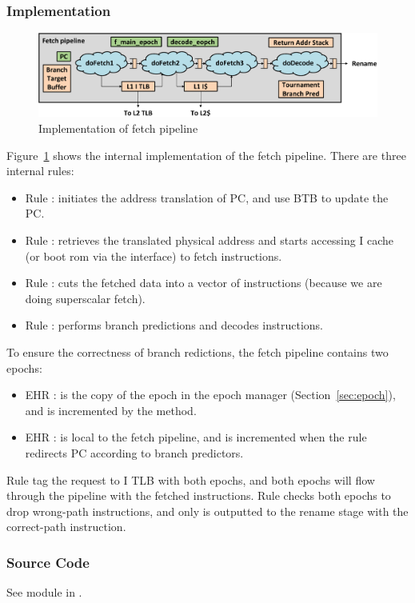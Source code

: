 \subsubsection{Implementation}

\begin{figure}
    \centering
    \includegraphics[width=\columnwidth]{fig/fetch_crop.pdf}
    \caption{Implementation of fetch pipeline}\label{fig:fetch-impl}
\end{figure}

Figure~\ref{fig:fetch-impl} shows the internal implementation of the fetch pipeline.
There are three internal rules:
\begin{itemize}
    \item Rule : initiates the address translation of PC, and use BTB to update the PC.
    \item Rule : retrieves the translated physical address and starts accessing I cache (or boot rom via the  interface) to fetch instructions.
    \item Rule : cuts the fetched data into a vector of instructions (because we are doing superscalar fetch).
    \item Rule : performs branch predictions and decodes instructions.
\end{itemize}
To ensure the correctness of branch redictions, the fetch pipeline contains two epochs:
\begin{itemize}
    \item EHR : is the copy of the epoch in the epoch manager (Section~\ref{sec:epoch}), and is incremented by the  method.
    \item EHR : is local to the fetch pipeline, and is incremented when the  rule redirects PC according to branch predictors.
\end{itemize}
Rule  tag the request to I TLB with both epochs, and both epochs will flow through the pipeline with the fetched instructions.
Rule  checks both epochs to drop wrong-path instructions, and only  is outputted to the rename stage with the correct-path instruction.

\subsubsection{Source Code}
See module  in .

